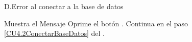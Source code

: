 		\begin{UCtrayectoriaA}{D.}{Error al conectar a la base de datos}

			\UCpaso Muestra el Mensaje 
			\UCpaso[\UCactor] Oprime el botón .
			\UCpaso Continua en el paso \ref{CU4.2ConectarBaseDatos} del .

		\end{UCtrayectoriaA}		





